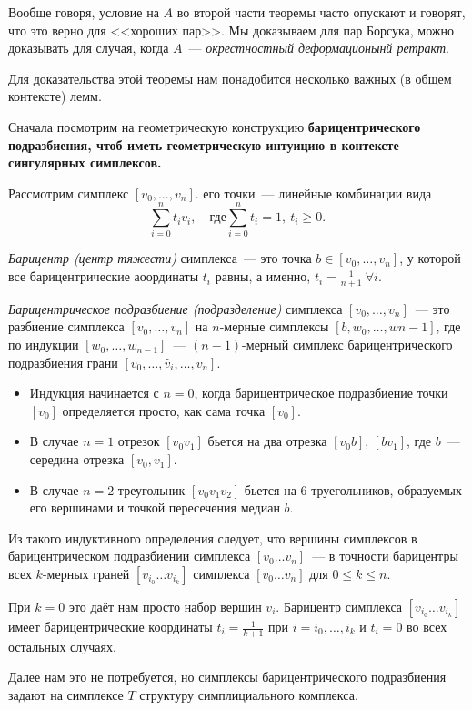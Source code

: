     Вообще говоря, условие на $A$ во второй части теоремы часто опускают и говорят, что это верно для <<хороших пар>>. 
    Мы доказываем для пар Борсука, можно доказывать для случая, когда $A$~--- \emph{окрестностный деформационынй ретракт}.


    Для доказательства этой теоремы нам понадобится несколько важных (в общем контексте) лемм.

    Сначала посмотрим на геометрическую конструкцию \bf{барицентрического подразбиения}, чтоб
    иметь геометрическую интуицию в контексте сингулярных симплексов.

    Рассмотрим симплекс $[v_{0}, \ldots, v_{n}]$. его точки~--- линейные комбинации вида
     \[ \sum_{i = 0}^{n} t_i v_i, \quad \text{где} \sum_{i = 0}^{n} t_i = 1, \ t_i \ge 0. \]
    \begin{definition}
        \emph{Барицентр (центр тяжести)} симплекса~--- это точка $b \in [v_0, \ldots, v_n]$, у которой все барицентрические аоординаты $t_i$ равны, а именно,
        $t_i = \frac{1}{n + 1} \ \forall i$.

        \emph{Барицентрическое подразбиение (подразделение)} симплекса $[v_0, \ldots, v_n]$~--- это разбиение симплекса $[v_0, \ldots, v_n]$ на $n$-мерные симплексы
        $[b, w_0, \ldots, w{n - 1}]$, где по индукции $[w_0, \ldots, w_{n - 1}]$~--- $(n - 1)$-мерный симплекс барицентрического подразбиения грани $[v_0, \ldots, \hat{v}_i, \ldots, v_n]$.
        \begin{itemize}
            \item Индукция начинается с $n = 0$, когда барицентрическое подразбиение точки $[v_0]$ определяется просто, как сама точка $[v_0]$.
            \item В случае $n = 1$
        отрезок $[v_0 v_1]$ бьется на два отрезка $[v_0 b]$, $[b v_1]$, где $b$~--- середина отрезка $[v_0, v_1]$.
            \item В случае $n = 2$ треугольник $[v_0 v_1 v_2]$ бьется на 6 труегольников, образуемых его вершинами и точкой пересечения медиан $b$.
        \end{itemize}

        Из такого индуктивного определения следует, что вершины симплексов в барицентрическом подразбиении симплекса $[v_0 \ldots v_n]$~--- в точности барицентры всех
        $k$-мерных граней $[v_{i_0} \ldots v_{i_k}]$ симплекса $[v_0 \ldots v_n]$ для $0 \le k \le n$.

        При $k = 0$ это даёт нам просто набор вершин $v_i$. Барицентр симплекса $[v_{i_0} \ldots v_{i_k}]$ имеет барицентрические координаты
        $t_i = \frac{1}{k + 1}$ при $i = i_0, \ldots, i_k$ и $t_i = 0$ во всех остальных случаях.

    \end{definition}

    \begin{remark}
       Далее нам это не потребуется, но симплексы барицентрического подразбиения задают на симплексе $T$ структуру симплициального комплекса.
    \end{remark}










